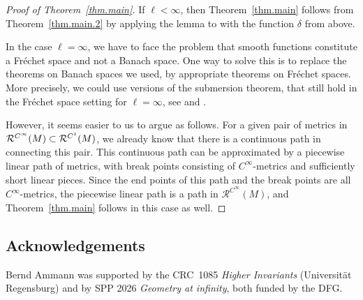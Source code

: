 \documentclass[pdftex]{sigma}
\newcommand\ceq{\coloneqq}
\newcommand\<{\langle}
\renewcommand\>{\rangle}
\newcommand{\maM}{\mathcal M}
\newcommand{\maR}{\mathcal R}
\theoremstyle{definition}
\newcommand\={\,=\,}
\numberwithin{equation}{section}
\begin{document}
\begin{proof}[Proof of Theorem~\ref{thm.main}]
If $\ell < \infty$, then Theorem~\ref{thm.main} follows from Theorem~\ref{thm.main.2} by applying the lemma to \smash{$\maM\ceq \maR^{C^\ell}(M)$} with the function $\delta$ from above.

In the case $\ell = \infty$, we have to face the problem that smooth functions constitute a Fr\'echet space and not a Banach space. One way to solve this is to replace the theorems on Banach spaces we used, by appropriate theorems on Fr\'echet spaces. More precisely, we could use versions of the submersion theorem, that still hold in the Fr\'echet space setting for $\ell=\infty$, see \cite[Proposition~III.11]{neeb.wagemann} and \cite[around Theorem~D]{gloeckner}.

However, it seems easier to us to argue as follows.
For a given pair of metrics in $\smash{\maR^{C^\infty}(M)}\subset\smash{\maR^{C^1}(M)}$, we already know
that there is a continuous path in \smash{$\maR^{C^1}(M)$} connecting this pair.
This continuous path can be approximated by a piecewise linear path of metrics, with break points consisting of $C^\infty$-metrics and sufficiently short linear pieces. Since the end points of this path and the break points are all $C^\infty$-metrics, the piecewise linear path is a path in $\maR^{C^\infty}(M)$, and Theorem~\ref{thm.main} follows in this case as well.
\end{proof}

\subsection*{Acknowledgements}
Bernd Ammann was supported by the CRC~1085 \emph{Higher Invariants} (Universit\"at Regensburg) and by SPP 2026 \emph{Geometry at infinity}, both funded by the DFG.
\end{document}
